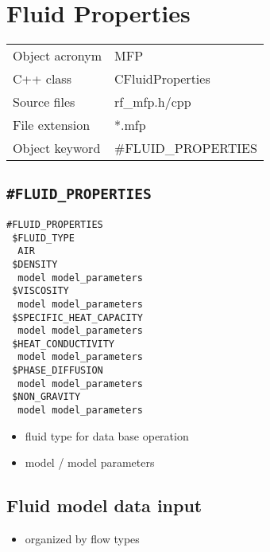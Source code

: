 \section{Fluid Properties}

\begin{tabular*}{8.35cm}{|p{2.5cm}|p{5cm}|} \hline
Object acronym & MFP \\
C++ class      & CFluidProperties \\
Source files   & rf\_mfp.h/cpp \\
\hline
File extension & *.mfp \\
Object keyword & \#FLUID\_PROPERTIES \\
\hline
\end{tabular*}

\subsection{\texttt{\bf\#FLUID\_PROPERTIES}}


\begin{verbatim}
#FLUID_PROPERTIES
 $FLUID_TYPE
  AIR
 $DENSITY
  model model_parameters
 $VISCOSITY
  model model_parameters
 $SPECIFIC_HEAT_CAPACITY
  model model_parameters
 $HEAT_CONDUCTIVITY
  model model_parameters
 $PHASE_DIFFUSION
  model model_parameters
 $NON_GRAVITY
  model model_parameters
\end{verbatim}

\begin{itemize}
  \item fluid type for data base operation
  \item model / model parameters
\end{itemize}


\subsection{Fluid model data input}

\begin{itemize}
  \item organized by flow types
\end{itemize}


